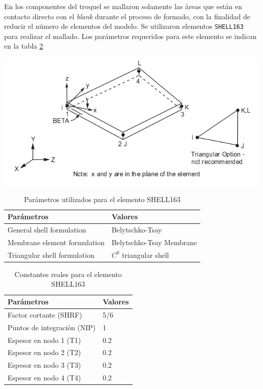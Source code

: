 En los componentes del troquel se mallaron solamente las áreas que están en contacto directo con el 
\textit{blank} durante el proceso de formado, con la finalidad de reducir el número de elementos del modelo. 
Se utilizaron elementos \texttt{SHELL163} para realizar el mallado. Los parámetros requeridos para 
este elemento se indican en la tabla \ref{tab:shell_param}

\begin{center}
\includegraphics[scale=0.65]{src/ch3/shell163.png}
\label{fig:shell163}
\end{center}


\begin{table}[h]
\centering
\caption{Parámetros utilizados para el elemento SHELL163}
\label{}
\begin{tabular}{p{6cm} p{6cm}} \hline
Parámetros & Valores \\
\hline
General shell formulation & Belytschko-Tsay \\
Membrane element formulation & Belytschko-Tsay Membrane \\
Triangular shell formulation & $C^0$ triangular shell \\
\hline
\end{tabular}
\label{tab:shell_param}
\end{table}


\begin{table}[h]
\centering
\caption{Constantes reales para el elemento SHELL163}
\label{}
\begin{tabular}{p{6cm} p{3cm}} \hline
Parámetros & Valores \\
\hline
Factor cortante (SHRF) & 5/6 \\
Puntos de integración (NIP) & 1 \\
Espesor en nodo 1 (T1) & 0.2 \\
Espesor en nodo 2 (T2) & 0.2 \\
Espesor en nodo 3 (T3) & 0.2 \\
Espesor en nodo 4 (T4) & 0.2 \\
\hline
\end{tabular}
\label{tab:shell_param}
\end{table}


